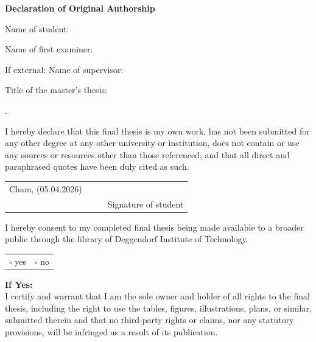 \thispagestyle{empty}
\newcommand{\signature}[1]{
	\bigskip
	\noindent
	\begin{tabular*}{\linewidth}{lp{3cm}p{1cm} p{6cm}}
		Cham, (05.04.2026) & \dotfill & & \dotfill \\
		& {} & & {\centering \footnotesize #1}
	\end{tabular*}
}
\newcommand{\HRule}{\hrule\vspace{0.1mm}\noindent}

\begin{center}
	{\Large\bfseries Declaration of Original Authorship}
\end{center}

\noindent
Name of student: \quad \student{}

\noindent
Name of first examiner: \quad \supervisor{}

\noindent
If external: Name of supervisor: \quad \secsupervisor{}

\noindent
Title of the master's thesis:
\noindent {\def\\{\relax\ifhmode\unskip\fi\space\ignorespaces}\thesistitleDE}
\noindent
\begin{list}{.}{
		\setlength{\leftmargin}{0pt}
		\setlength{\itemindent}{0pt}
		\setlength{\labelwidth}{0pt}
		\setlength{\labelsep}{2pt}}
	\item I hereby declare that this final thesis is my own work, has not been submitted for any other degree at any other university or institution, does not contain or use any sources or resources other than those referenced, and that all direct and paraphrased quotes have been duly cited as such.

	      \signature{Signature of student}
	\item I hereby consent to my completed final thesis being made available to a broader public through the library of Deggendorf Institute of Technology.

	      \begin{tabular}{@{}ll@{}}
		      \qquad$\square$ yes & \qquad$\square$ no \\
	      \end{tabular}

\end{list}

\noindent
\textbf{If Yes:}\\
I certify and warrant that I am the sole owner and holder of all rights to the final thesis, including the right to use the tables, figures, illustrations, plans, or similar, submitted therein and that no third-party rights or claims, nor any statutory provisions, will be infringed as a result of its publication.

